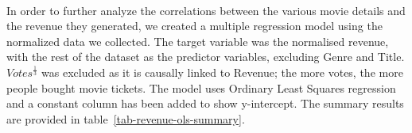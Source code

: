         \begin{multicols}{2}
            \paragraph{}
                In order to further analyze the correlations between the various movie details
                    and the revenue they generated, we created a multiple regression model using
                    the normalized data we collected.
                The target variable was the normalised revenue, with the rest of the dataset as
                    the predictor variables, excluding Genre and Title.
                $Votes^\frac{1}{3}$ was excluded as it is causally linked to Revenue; the more votes, the more people bought movie tickets.
                The model uses Ordinary Least Squares regression and a constant column has been
                    added to show y-intercept.
                The summary results are provided in table~\ref{tab-revenue-ols-summary}.
        \end{multicols}

